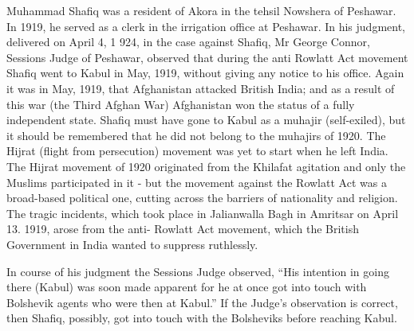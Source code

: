 Muhammad Shafiq was a resident of Akora in the tehsil Nowshera of Peshawar. In 1919, he served as a clerk in the irrigation office at Peshawar. In his judgment, delivered on April 4, 1 924, in the case against Shafiq, Mr George Connor, Sessions Judge of Peshawar, observed that during the anti Rowlatt Act movement Shafiq went to Kabul in May, 1919, without giving any notice to his office. Again it was in May, 1919, that Afghanistan attacked British India; and as a result of this war (the Third Afghan War) Afghanistan won the status of a fully independent state. Shafiq must have gone to Kabul as a muhajir (self-exiled), but it should be remembered that he did not belong to the muhajirs of 1920. The Hijrat (flight from persecution) movement was yet to start when he left India. The Hijrat movement of 1920 originated from the Khilafat agitation and only the Muslims participated in it - but the movement against the Rowlatt Act was a broad-based political one, cutting across the barriers of nationality and religion. The tragic incidents, which took place in Jalianwalla
Bagh in Amritsar on April 13. 1919, arose from the anti- Rowlatt Act movement, which the British Government in India wanted to suppress ruthlessly. 

In course of his judgment the Sessions Judge observed, “His intention in going there (Kabul) was soon made apparent for he at once got into touch with Bolshevik agents who were then at Kabul.” If the Judge’s observation is correct, then Shafiq, possibly, got into touch with the Bolsheviks before reaching Kabul. 


